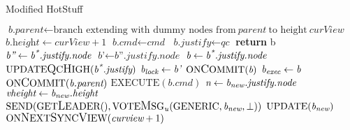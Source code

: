 \begin{algorithm}[h!]
	\caption{Modified HotStuff}\label{hotstuffalgorithm}
	\begin{algorithmic}[1]
	 \label{code_createleaf}
		\color{Magenta}
		\State $\textit{b.parent} \gets \text{branch extending with dummy nodes from}\ \textit{parent}\ \text{to height}\ \textit{curView}$
		\State $\textit{b.height} \gets \textit{curView} + 1$
		\color{black}
		\State $\textit{b.cmd} \gets \textit{cmd}$
		\State $\textit{b.justify} \gets \textit{qc}$
		\State \textbf{return} b
	\EndFunction
		\State $\textit{b''} \gets \textit{b\textsuperscript{*}.justify.node}$
		\State $\textit{b'} \gets \textit{b''.justify.node}$
		\State $\textit{b} \gets \textit{b\textsuperscript{*}.justify.node}$
		\State $\text{UPDATE{\large Q}C{\large H}IGH}(\textit{b\textsuperscript{*}.justify})$
			\State $\textit{b\textsubscript{lock}} \gets \textit{b'}$
		\EndIf
			\State $\text{ON{\large C}OMMIT}(\textit{b})$
			\State $\textit{b\textsubscript{exec}} \gets \textit{b}$
		\EndIf
	\EndProcedure
			\State $\text{ON{\large C}OMMIT}(\textit{b.parent})$
			\State $\text{EXECUTE}(\textit{b.cmd})$
		\EndIf
	\EndProcedure
	 \label{code_onreceiveproposal}
		\color{Green}
		 \label{code_checkview}
			\color{black}
			\State $\textit{n} \gets \textit{b\textsubscript{new}.justify.node}$
				\State $\textit{vheight} \gets \textit{b\textsubscript{new}.height}$
				\State $ \text{SEND}(\text{GET{\large L}EADER}(), \text{VOTE{\large M}SG}\textsubscript{\textit{u}}(\text{GENERIC}, \textit{b\textsubscript{new}}, \bot))$
			\EndIf
			\State $\text{UPDATE}(\textit{b\textsubscript{new}})$
			\color{Green}
			 \label{code_proposaltransition}
				\State $\text{ON{\large N}EXT{\large S}YNC{\large V}IEW}(\textit{curview} + 1)$

\end{algorithmic}
\end{algorithm}
